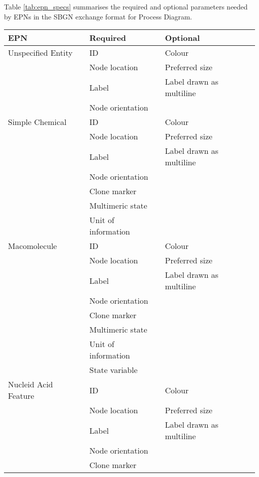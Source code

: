 \documentclass[11pt]{article}
\begin{document}
Table \ref{tab:epn_specs} summarises the required and optional parameters needed by EPNs in the SBGN exchange format for Process Diagram.

\begin{table}[H]
   \centering
   \begin{tabular*}{0.95\textwidth}{ l l l   }
      \toprule
      \toprule
      \textbf{EPN}    		& \textbf{Required} 			&  \textbf{Optional} \\
     \midrule
     \midrule
      Unspecified Entity	& ID				& Colour \\
					& Node location	& Preferred size \\
      				      	& Label 			& Label drawn as multiline\\
      					& Node orientation	&  \\
     \midrule
      Simple Chemical		& ID				& Colour \\
					& Node location	& Preferred size \\
      				      	& Label 			& Label drawn as multiline\\
      					& Node orientation	&  \\
      				       	& Clone marker	& 		 \\
      					& Multimeric state	&  \\
      					& Unit of information	&  \\
     \midrule
      Macomolecule		& ID				& Colour \\
					& Node location	& Preferred size \\
      				      	& Label 			& Label drawn as multiline\\
      					& Node orientation	&  \\
      				       	& Clone marker	& 		 \\
      					& Multimeric state	&  \\
        					& Unit of information	&  \\
      					& State variable	&  \\
   \midrule
      Nucleid Acid Feature	& ID				& Colour \\
					& Node location	& Preferred size \\
      				      	& Label 			& Label drawn as multiline\\
      					& Node orientation	&  \\
      				       	& Clone marker	& 		 \\

\end{tabular*}
\end{table}
\end{document}
